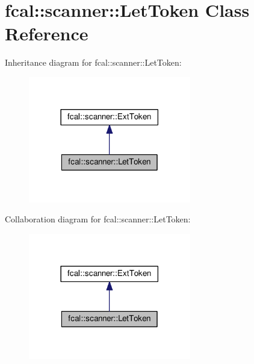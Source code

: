 \hypertarget{classfcal_1_1scanner_1_1LetToken}{}\section{fcal\+:\+:scanner\+:\+:Let\+Token Class Reference}
\label{classfcal_1_1scanner_1_1LetToken}


Inheritance diagram for fcal\+:\+:scanner\+:\+:Let\+Token\+:\nopagebreak
\begin{figure}[H]
\begin{center}
\leavevmode
\includegraphics[width=201pt]{classfcal_1_1scanner_1_1LetToken__inherit__graph}
\end{center}
\end{figure}


Collaboration diagram for fcal\+:\+:scanner\+:\+:Let\+Token\+:\nopagebreak
\begin{figure}[H]
\begin{center}
\leavevmode
\includegraphics[width=201pt]{classfcal_1_1scanner_1_1LetToken__coll__graph}
\end{center}
\end{figure}
